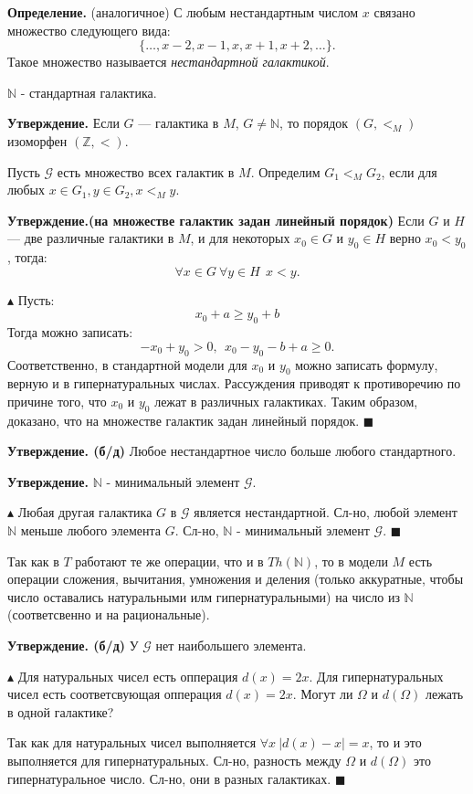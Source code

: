 \textbf{Определение.} (аналогичное) С любым нестандартным числом $x$ связано множество следующего вида:
$$\{\ldots , x - 2, x - 1, x , x  + 1, x + 2, \ldots \}.$$
Такое множество называется \textit{нестандартной галактикой}.

$\mathbb{N}$ - стандартная галактика.

\textbf{Утверждение.} Если $G$ — галактика в $M$, $G \neq \mathbb{N}$, то порядок $(G, <_M)$ изоморфен $(\mathbb{Z}, <)$.

Пусть $\mathcal{G}$ есть множество всех галактик в $M$. Определим $G_1 <_M G_2$, если для любых $x \in  G_1, y \in  G_2, x <_M y$.

\textbf{Утверждение.(на множестве галактик задан линейный порядок)} Если $G$ и $H$ — две различные галактики в $M$, и для некоторых $x_0 \in G$ и $y_0 \in H$ верно $x_0 < y_0$, тогда:
$$\forall x \in G \ \forall y \in H \ \ x < y.$$

$\blacktriangle$ Пусть:
$$x_0 + a \geq y_0 + b$$
Тогда можно записать:
$$-x_0 + y_0 > 0, \ \ x_0 - y_0 - b + a \geq 0.$$
Соответственно, в стандартной модели для $x_0$ и $y_0$ можно записать формулу, верную и в гипернатуральных числах.
Рассуждения приводят к противоречию по причине того, что $x_0$ и $y_0$ лежат в различных галактиках. Таким образом, доказано, что на множестве галактик задан линейный порядок. $\blacksquare$

\textbf{Утверждение. (б/д)} Любое нестандартное число больше любого стандартного. 

\textbf{Утверждение.} $\mathbb{N}$ - минимальный элемент $\mathcal{G}.$

$\blacktriangle$ Любая другая галактика $G$ в $\mathcal{G}$ является нестандартной. Сл-но, любой элемент $\mathbb{N}$ меньше любого элемента $G$. Сл-но, $\mathbb{N}$ - минимальный элемент $\mathcal{G}.$
$\blacksquare$

Так как в $T$ работают те же операции, что и в $Th(\mathbb{N})$, то в модели $M$ есть операции сложения, вычитания, умножения и деления (только аккуратные, чтобы число оставались натуральными илм гипернатуральными) на число из $\mathbb{N}$ (соответсвенно и на рациональные).

\textbf{Утверждение. (б/д)} У $\mathcal{G}$ нет наибольшего элемента.

$\blacktriangle$
Для натуральных чисел есть опперация $d(x) = 2x$. Для гипернатуральных чисел есть соответсвующая опперация $d(x) = 2x$. Могут ли $\Omega$ и $d(\Omega)$ лежать в одной галактике?

Так как для натуральных чисел выполняется $\forall x \ |d(x) - x| = x$, то и это выполняется для гипернатуральных. Сл-но, разность между $\Omega$ и $d(\Omega)$ это гипернатуральное число. Сл-но, они в разных галактиках.
$\blacksquare$

